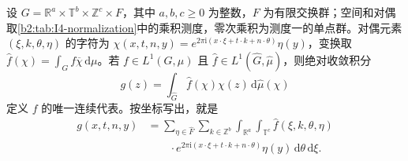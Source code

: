 \begin{theorem}[乘积模型上的绝对反演]\label{b2:thm:I4-model-inversion}
设 \(G=\mathbb R^a\times\mathbb T^b\times\mathbb Z^c\times F\)，其中 \(a,b,c\ge0\) 为整数，\(F\) 为有限交换群；空间和对偶取\cref{b2:tab:I4-normalization}中的乘积测度，零次乘积为测度一的单点群。对偶元素 \((\xi,k,\theta,\eta)\) 的字符为
\(\chi(x,t,n,y)=e^{2\pi\mathrm i(x\cdot\xi+t\cdot k+n\cdot\theta)}\eta(y)\)，变换取 \(\widehat f(\chi)=\int_G f\overline\chi\,\mathrm d\mu\)。若 \(f\in L^1(G,\mu)\) 且 \(\widehat f\in L^1(\widehat G,\widehat\mu)\)，则绝对收敛积分
\[
 g(z)=\int_{\widehat G}\widehat f(\chi)\chi(z)\,\mathrm d\widehat\mu(\chi)
\]
定义 \(f\) 的唯一连续代表。按坐标写出，就是
\begin{align*}
 g(x,t,n,y)
 &=\sum_{\eta\in\widehat F}\sum_{k\in\mathbb Z^b}
       \int_{\mathbb R^a}\int_{\mathbb T^c}
       \widehat f(\xi,k,\theta,\eta)\\[-2pt]
 &\hspace{2em}\cdot e^{2\pi\mathrm i(x\cdot\xi+t\cdot k+n\cdot\theta)}
       \eta(y)\,\mathrm d\theta\,\mathrm d\xi.
\end{align*}
\end{theorem}
